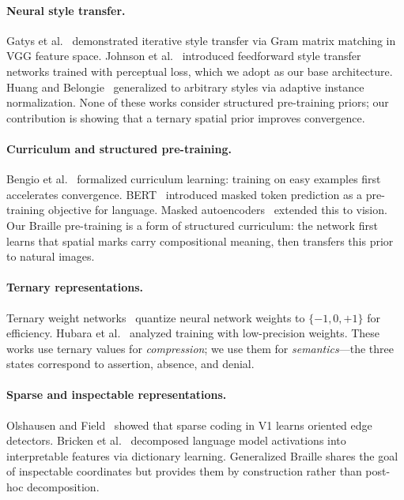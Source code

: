 \documentclass[11pt,a4paper]{article}
\begin{document}
\paragraph{Neural style transfer.}
Gatys et al.~\cite{gatys2016image} demonstrated iterative
style transfer via Gram matrix matching in VGG feature space.
Johnson et al.~\cite{johnson2016perceptual} introduced
feedforward style transfer networks trained with perceptual loss,
which we adopt as our base architecture.
Huang and Belongie~\cite{huang2017adain} generalized to
arbitrary styles via adaptive instance normalization.
None of these works consider structured pre-training
priors; our contribution is showing that a ternary spatial prior
improves convergence.

\paragraph{Curriculum and structured pre-training.}
Bengio et al.~\cite{bengio2009curriculum} formalized curriculum
learning: training on easy examples first accelerates convergence.
BERT~\cite{devlin2019bert} introduced masked token prediction
as a pre-training objective for language.
Masked autoencoders~\cite{he2022mae} extended this to vision.
Our Braille pre-training is a form of structured curriculum:
the network first learns that spatial marks carry compositional
meaning, then transfers this prior to natural images.

\paragraph{Ternary representations.}
Ternary weight networks~\cite{courbariaux2016ternary} quantize
neural network weights to $\{-1, 0, +1\}$ for efficiency.
Hubara et al.~\cite{hubara2017quantized} analyzed training
with low-precision weights.
These works use ternary values for \emph{compression};
we use them for \emph{semantics}---the three states correspond
to assertion, absence, and denial.

\paragraph{Sparse and inspectable representations.}
Olshausen and Field~\cite{olshausen1997sparse} showed that
sparse coding in V1 learns oriented edge detectors.
Bricken et al.~\cite{bricken2023monosemanticity} decomposed
language model activations into interpretable features via
dictionary learning.
Generalized Braille shares the goal of inspectable coordinates
but provides them by construction rather than post-hoc
decomposition.
\end{document}
